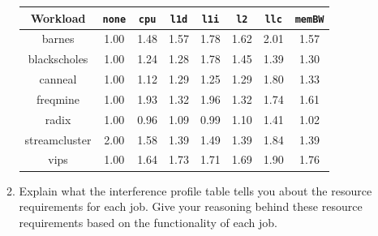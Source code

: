 \begin{enumerate}
\begin{enumerate}
        \begin{center}
        \begin{tabular}{ |c|c|c|c|c|c|c|c| } 
        \hline
         \textbf{Workload} & \texttt{\textbf{none}} & \texttt{\textbf{cpu}} & \texttt{\textbf{l1d}} & \texttt{\textbf{l1i}} & \texttt{\textbf{l2}} & \texttt{\textbf{llc}} & \texttt{\textbf{memBW}}  \\
         \hline\hline
        barnes         & 1.00 & \cellcolor{YellowOrange} 1.48 & \cellcolor{YellowOrange} 1.57 & \cellcolor{YellowOrange} 1.78 & \cellcolor{YellowOrange} 1.62 & \cellcolor{Red} 2.01 & \cellcolor{YellowOrange} 1.57 \\  \hline
        blackscholes         & 1.00 & \cellcolor{Green} 1.24 & \cellcolor{Green} 1.28 & \cellcolor{YellowOrange} 1.78 & \cellcolor{YellowOrange} 1.45 & \cellcolor{YellowOrange} 1.39 & \cellcolor{Green} 1.30 \\  \hline
        canneal & 1.00 & \cellcolor{Green} 1.12 & \cellcolor{Green} 1.29 & \cellcolor{Green} 1.25 & \cellcolor{Green} 1.29 & \cellcolor{YellowOrange} 1.80 & \cellcolor{YellowOrange} 1.33 \\  \hline
        freqmine & 1.00 & \cellcolor{YellowOrange} 1.93 & \cellcolor{YellowOrange} 1.32 & \cellcolor{YellowOrange} 1.96 & \cellcolor{YellowOrange} 1.32 & \cellcolor{YellowOrange} 1.74 & \cellcolor{YellowOrange} 1.61 \\  \hline
        radix & 1.00 & \cellcolor{Green} 0.96 & \cellcolor{Green} 1.09 & \cellcolor{Green} 0.99 & \cellcolor{Green} 1.10 & \cellcolor{YellowOrange} 1.41 & \cellcolor{Green} 1.02 \\  \hline
        streamcluster & 2.00 & \cellcolor{YellowOrange} 1.58 & \cellcolor{YellowOrange} 1.39 & \cellcolor{YellowOrange} 1.49 & \cellcolor{YellowOrange} 1.39 & \cellcolor{YellowOrange} 1.84 & \cellcolor{YellowOrange} 1.39 \\  \hline
        vips & 1.00 & \cellcolor{YellowOrange} 1.64 & \cellcolor{YellowOrange} 1.73 & \cellcolor{YellowOrange} 1.71 & \cellcolor{YellowOrange} 1.69 & \cellcolor{YellowOrange} 1.90 & \cellcolor{YellowOrange} 1.76 \\  \hline
        \end{tabular}
        \end{center}


        \item Explain what the interference profile table tells you about the resource requirements for each job. Give your reasoning behind these resource requirements based on the functionality of each job.


\end{enumerate}
\end{enumerate}

